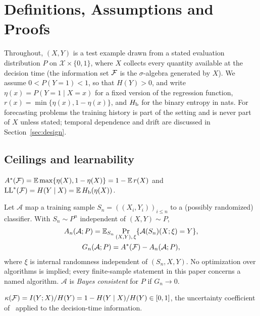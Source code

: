 \section{Definitions, Assumptions and Proofs}\label{app:math}
Throughout, $(X,Y)$ is a test example drawn from a stated evaluation distribution $P$ on $\mathcal X\times\{0,1\}$, where $X$ collects every quantity available at the decision time (the information set $\mathcal{F}$ is the $\sigma$-algebra generated by $X$). We assume $0<P(Y=1)<1$, so that $H(Y)>0$, and write $\eta(x)=P(Y=1\mid X=x)$ for a fixed version of the regression function, $r(x)=\min\{\eta(x),1-\eta(x)\}$, and $H_{\mathrm b}$ for the binary entropy in nats. For forecasting problems the training history is part of the setting and is never part of $X$ unless stated; temporal dependence and drift are discussed in Section~\ref{sec:design}.

\subsection{Ceilings and learnability}
\begin{definition}
$A^*(\mathcal{F})=\mathbb{E}\max\{\eta(X),1-\eta(X)\}=1-\mathbb{E}\,r(X)$ and $\mathrm{LL}^*(\mathcal{F})=H(Y\mid X)=\mathbb{E}\,H_{\mathrm b}(\eta(X))$.
\end{definition}
\begin{definition}
Let $\mathcal A$ map a training sample $S_n=((X_i,Y_i))_{i\le n}$ to a (possibly randomized) classifier. With $S_n\sim P^n$ independent of $(X,Y)\sim P$,
\begin{gather*}
A_n(\mathcal A;P)=\mathbb{E}_{S_n}\Pr_{(X,Y),\,\xi}\{\mathcal A(S_n)(X;\xi)=Y\},\\
G_n(\mathcal A;P)=A^*(\mathcal{F})-A_n(\mathcal A;P),
\end{gather*}
where $\xi$ is internal randomness independent of $(S_n,X,Y)$. No optimization over algorithms is implied; every finite-sample statement in this paper concerns a named algorithm. $\mathcal A$ is \emph{Bayes consistent} for $P$ if $G_n\to0$.
\end{definition}
\begin{definition}
$\kappa(\mathcal{F})=I(Y;X)/H(Y)=1-H(Y\mid X)/H(Y)\in[0,1]$, the uncertainty coefficient of~\cite{theil1970estimation} applied to the decision-time information.
\end{definition}

